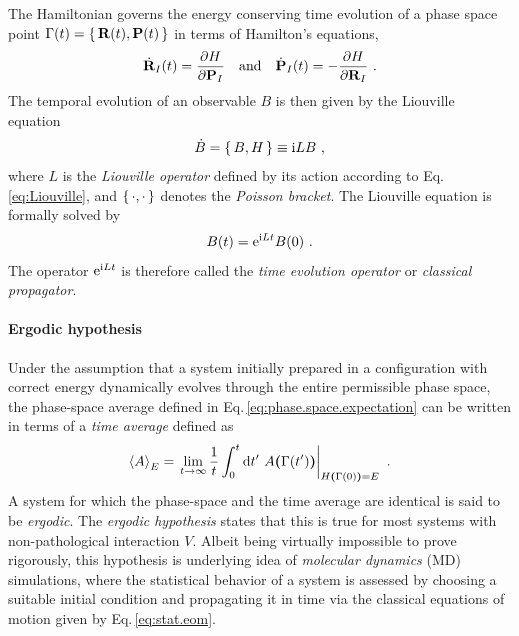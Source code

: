 The Hamiltonian governs the energy conserving time evolution of a phase space point $\Gamma (t) = \set{{\bf R} (t), {\bf P} (t)}$ in terms of Hamilton's equations,
\begin{align}
	\dot{\b R}_I (t) = \frac{\partial H}{\partial \b P_I} \quad\text{and}\quad
	\dot{\b P}_I (t) = -\frac{\partial H}{\partial \b R_I}~.
	\label{eq:stat.eom}
\end{align}
The temporal evolution of an observable $B$ is then given by the Liouville equation~\cite{Tuckerman}
\begin{align}
	\dot{B} = \set{B, H} \equiv \im L B~,
	\label{eq:Liouville}
\end{align}
where $L$ is the \emph{Liouville operator} defined by its action according to Eq.\,\eqref{eq:Liouville}, and $\set{\cdot , \cdot}$ denotes the \emph{Poisson bracket}.
The Liouville equation is formally solved by
\begin{align}
	B (t) = {\rm e}^{\im L t} B(0)~.
	\label{eq:B.time.evolution}
\end{align}
The operator ${\rm e}^{{\rm i} L t}$ is therefore called the \emph{time evolution operator} or \emph{classical propagator}.

\paragraph{Ergodic hypothesis}
Under the assumption that a system initially prepared in a configuration with correct energy dynamically evolves through the entire permissible phase space, the phase-space average defined in Eq.\,\eqref{eq:phase.space.expectation} can be written in terms of a \emph{time average} defined as
\begin{align}
  \braket{A}_E 
    = \left. \lim\limits_{t \to \infty} \frac{1}{t} \int_0^t \d t' ~ A {\bm (} \Gamma(t') {\bm )}
	    \right\vert_{H \bm ( \Gamma (0) \bm ) = E}~.
	\label{eq:time.average}
\end{align}
A system for which the phase-space and the time average are identical is said to be \emph{ergodic}. The \emph{ergodic hypothesis} states that this is true for most systems with non-pathological interaction $V$. Albeit being virtually impossible to prove rigorously, this hypothesis is underlying idea of \emph{molecular dynamics} (MD) simulations, where the statistical behavior of a system is assessed by choosing a suitable initial condition and propagating it in time via the classical equations of motion given by Eq.\,\eqref{eq:stat.eom}.

